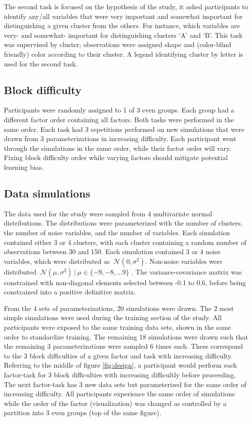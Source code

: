 \documentclass[
]{article}
\begin{document}
The second task is focused on the hypothesis of the study, it asked
participants to identify any/all variables that were very important and
somewhat important for distinguishing a given cluster from the others.
For instance, which variables are very- and somewhat- important for
distinguishing clusters `A' and `B'. This task was supervised by
cluster; observations were assigned shape and (color-blind friendly)
color according to their cluster. A legend identifying cluster by letter
is used for the second task.

\hypertarget{sec:blocks}{%
\subsection{Block difficulty}\label{sec:blocks}}

Participants were randomly assigned to 1 of 3 even groups. Each group
had a different factor order containing all factors. Both tasks were
performed in the same order. Each task had 3 repetitions performed on
new simulations that were drawn from 3 parameterizations in increasing
difficulty. Each participant went through the simulations in the same
order, while their factor order will vary. Fixing block difficulty order
while varying factors should mitigate potential learning bias.

\hypertarget{sec:sim}{%
\subsection{Data simulations}\label{sec:sim}}

The data used for the study were sampled from 4 multivariate normal
distributions. The distributions were parameterized with the number of
clusters, the number of noise variables, and the number of variables.
Each simulation contained either 3 or 4 clusters, with each cluster
containing a random number of observations between 30 and 150. Each
simulation contained 3 or 4 noise variables, which were distributed as
\(~ \mathcal{N}(0, \sigma^2)\). Non-noise variables were distributed
\(~ \mathcal{N}(\mu, \sigma^2)~|~\mu\in \{-9, -8, ... 9\}\) . The
variance-covariance matrix was constrained with non-diagonal elements
selected between -0.1 to 0.6, before being constrained into a positive
definitive matrix.

From the 4 sets of parameterizations, 20 simulations were drawn. The 2
most simple simulations were used during the training section of the
study. All participants were exposed to the same training data sets,
shown in the same order to standardize training. The remaining 18
simulations were drawn such that the remaining 3 parameterizations were
sampled 6 times each. These correspond to the 3 block difficulties of a
given factor and task with increasing difficulty. Referring to the
middle of figure \ref{fig:design}, a participant would perform each
factor-task for 3 block difficulties with increasing difficultly before
proceeding. The next factor-task has 3 new data sets but parameterized
for the same order of increasing difficulty. All participants experience
the same order of simulations while the order of the factor
(visualization) was changed as controlled by a partition into 3 even
groups (top of the same figure).
\end{document}
